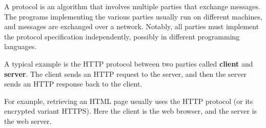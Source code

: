 A protocol is an algorithm that involves multiple parties that exchange messages.
The programs implementing the various parties usually run on different machines, and messages are exchanged over a network.
Notably, all parties must implement the protocol specification independently, possibly in different programming languages.

A typical example is the HTTP protocol between two parties called \textbf{client} and \textbf{server}.
The client sends an HTTP request to the server, and then the server sends an HTTP response back to the client.

For example, retrieving an HTML page usually uses the HTTP protocol (or its encrypted variant HTTPS).
Here the client is the web browser, and the server is the web server.
